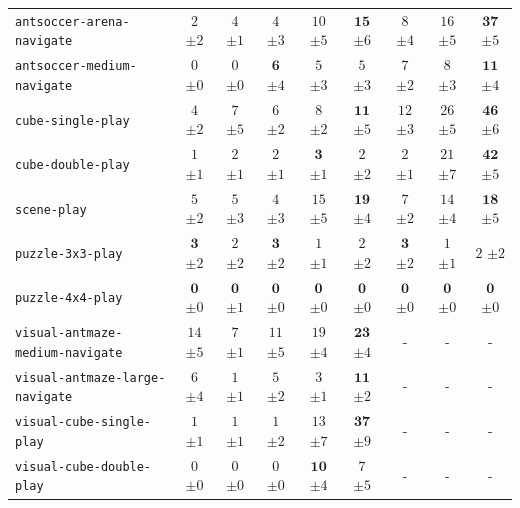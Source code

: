 \documentclass{article}
\begin{document}
\begin{table}[t!]
{\begin{tabular}{lcccccccc}
\texttt{antsoccer-arena-navigate} & $2$ {\tiny $\pm 2$} & $4$ {\tiny $\pm 1$} & $4$ {\tiny $\pm 3$} & $10$ {\tiny $\pm 5$} & $\mathbf{15}$ {\tiny $\pm 6$} & $8$ {\tiny $\pm 4$} & $16$ {\tiny $\pm 5$} & $\mathbf{37}$ {\tiny $\pm 5$} \\
\texttt{antsoccer-medium-navigate} & $0$ {\tiny $\pm 0$} & $0$ {\tiny $\pm 0$} & $\mathbf{6}$ {\tiny $\pm 4$} & $5$ {\tiny $\pm 3$} & $5$ {\tiny $\pm 3$} & $7$ {\tiny $\pm 2$} & $8$ {\tiny $\pm 3$} & $\mathbf{11}$ {\tiny $\pm 4$} \\
\texttt{cube-single-play} & $4$ {\tiny $\pm 2$} & $7$ {\tiny $\pm 5$} & $6$ {\tiny $\pm 2$} & $8$ {\tiny $\pm 2$} & $\mathbf{11}$ {\tiny $\pm 5$} & $12$ {\tiny $\pm 3$} & $26$ {\tiny $\pm 5$} & $\mathbf{46}$ {\tiny $\pm 6$} \\
\texttt{cube-double-play} & $1$ {\tiny $\pm 1$} & $2$ {\tiny $\pm 1$} & $2$ {\tiny $\pm 1$} & $\mathbf{3}$ {\tiny $\pm 1$} & $2$ {\tiny $\pm 2$} & $2$ {\tiny $\pm 1$} & $21$ {\tiny $\pm 7$} & $\mathbf{42}$ {\tiny $\pm 5$} \\
\texttt{scene-play} & $5$ {\tiny $\pm 2$} & $5$ {\tiny $\pm 3$} & $4$ {\tiny $\pm 3$} & $15$ {\tiny $\pm 5$} & $\mathbf{19}$ {\tiny $\pm 4$} & $7$ {\tiny $\pm 2$} & $14$ {\tiny $\pm 4$} & $\mathbf{18}$ {\tiny $\pm 5$} \\
\texttt{puzzle-3x3-play} & $\mathbf{3}$ {\tiny $\pm 2$} & $2$ {\tiny $\pm 2$} & $\mathbf{3}$ {\tiny $\pm 2$} & $1$ {\tiny $\pm 1$} & $2$ {\tiny $\pm 2$} & $\mathbf{3}$ {\tiny $\pm 2$} & $1$ {\tiny $\pm 1$} & $2$ {\tiny $\pm 2$} \\
\texttt{puzzle-4x4-play} & $\mathbf{0}$ {\tiny $\pm 0$} & $\mathbf{0}$ {\tiny $\pm 1$} & $\mathbf{0}$ {\tiny $\pm 0$} & $\mathbf{0}$ {\tiny $\pm 0$} & $\mathbf{0}$ {\tiny $\pm 0$} & $\mathbf{0}$ {\tiny $\pm 0$} & $\mathbf{0}$ {\tiny $\pm 0$} & $\mathbf{0}$ {\tiny $\pm 0$} \\
\midrule
\texttt{visual-antmaze-medium-navigate} & $14$ {\tiny $\pm 5$} & $7$ {\tiny $\pm 1$} & $11$ {\tiny $\pm 5$} & $19$ {\tiny $\pm 4$} & $\mathbf{23}$ {\tiny $\pm 4$} & - & - & - \\
\texttt{visual-antmaze-large-navigate} & $6$ {\tiny $\pm 4$} & $1$ {\tiny $\pm 1$} & $5$ {\tiny $\pm 2$} & $3$ {\tiny $\pm 1$} & $\mathbf{11}$ {\tiny $\pm 2$} & - & - & - \\
\texttt{visual-cube-single-play} & $1$ {\tiny $\pm 1$} & $1$ {\tiny $\pm 1$} & $1$ {\tiny $\pm 2$} & $13$ {\tiny $\pm 7$} & $\mathbf{37}$ {\tiny $\pm 9$} & - & - & - \\
\texttt{visual-cube-double-play} & $0$ {\tiny $\pm 0$} & $0$ {\tiny $\pm 0$} & $0$ {\tiny $\pm 0$} & $\mathbf{10}$ {\tiny $\pm 4$} & $7$ {\tiny $\pm 5$} & - & - & - \\

\end{tabular}}
\end{table}
\end{document}
